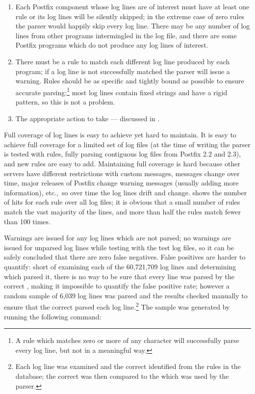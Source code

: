 \begin{enumerate}

    \item Each Postfix component whose log lines are of interest must have
        at least one rule or its log lines will be silently skipped; in the
        extreme case of zero rules the parser would happily skip every log
        line.  There may be any number of log lines from other programs
        intermingled in the log file, and there are some Postfix programs
        which do not produce any log lines of interest.

    \item There must be a rule to match each different log line produced by
        each program; if a log line is not successfully matched the parser
        will issue a warning.  Rules should be as specific and tightly
        bound as possible to ensure accurate parsing:\footnote{A rule which
        matches zero or more of any character will successfully parse every
        log line, but not in a meaningful way.} most log lines contain
        fixed strings and have a rigid pattern, so this is not a problem.

    \item The appropriate action to take --- discussed in
        .

\end{enumerate}

Full coverage of log lines is easy to achieve yet hard to maintain.  It is
easy to achieve full coverage for a limited set of log files (at the time
of writing the parser is tested with \numberOFrules{} rules, fully parsing
\numberOFlogFILES{} contiguous log files from Postfix 2.2 and 2.3), and new
rules are easy to add.  Maintaining full coverage is hard because other
servers have different restrictions with custom messages, \DNSBL{} messages
change over time, major releases of Postfix change warning messages
(usually adding more information), etc.,\ so over time the log lines drift
and change.   shows the number of hits
for each rule over all \numberOFlogFILES{} log files; it is obvious that a
small number of rules match the vast majority of the lines, and more than
half the rules match fewer than 100 times.

Warnings are issued for any log lines which are not parsed; no warnings are
issued for unparsed log lines while testing with the \numberOFlogFILES{}
test log files, so it can be safely concluded that there are zero false
negatives.  False positives are harder to quantify: short of examining each
of the 60,721,709 log lines and determining which \regex{} parsed it, there
is no way to be sure that every line was parsed by the correct \regex{},
making it impossible to quantify the false positive rate; however a random
sample of 6,039 log lines was parsed and the results checked manually to
ensure that the correct \regex{} parsed each log line.\footnote{Each log
line was examined and the correct \regex{} identified from the
\numberOFrules{} rules in the database; the correct \regex{} was then
compared to the \regex{} which was used by the parser.}  The sample was
generated by running the following command:

